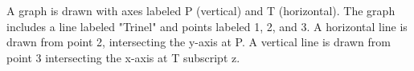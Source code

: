 A graph is drawn with axes labeled P (vertical) and T (horizontal). The graph includes a line labeled "Trinel" and points labeled 1, 2, and 3. A horizontal line is drawn from point 2, intersecting the y-axis at P. A vertical line is drawn from point 3 intersecting the x-axis at T subscript z.